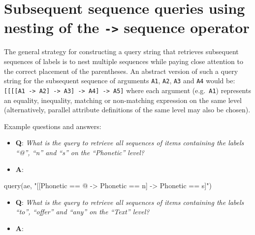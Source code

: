 \documentclass[
]{book}
\newenvironment{Shaded}{\begin{snugshade}}{\end{snugshade}}
\newcommand{\FunctionTok}[1]{\textcolor[rgb]{0.00,0.00,0.00}{#1}}
\newcommand{\NormalTok}[1]{#1}
\newcommand{\StringTok}[1]{\textcolor[rgb]{0.31,0.60,0.02}{#1}}
\providecommand{\tightlist}{%
  \setlength{\itemsep}{0pt}\setlength{\parskip}{0pt}}
\begin{document}
\hypertarget{subsequent-sequence-queries-using-nesting-of-the---sequence-operator}{%
\section{\texorpdfstring{Subsequent sequence queries using nesting of the \texttt{-\textgreater{}} sequence operator}{Subsequent sequence queries using nesting of the -\textgreater{} sequence operator}}\label{subsequent-sequence-queries-using-nesting-of-the---sequence-operator}}

The general strategy for constructing a query string that retrieves subsequent sequences of labels is to nest multiple sequences while paying close attention to the correct placement of the parentheses. An abstract version of such a query string for the subsequent sequence of arguments \texttt{A1}, \texttt{A2}, \texttt{A3} and \texttt{A4} would be: \texttt{{[}{[}{[}{[}A1\ -\textgreater{}\ A2{]}\ -\textgreater{}\ A3{]}\ -\textgreater{}\ A4{]}\ -\textgreater{}\ A5{]}} where each argument (e.g.~\texttt{A1}) represents an equality, inequality, matching or non-matching expression on the same level (alternatively, parallel attribute definitions of the same level may also be chosen).

Example questions and answers:

\begin{itemize}
\tightlist
\item
  \textbf{Q}: \emph{What is the query to retrieve all sequences of items containing the labels ``@'', ``n'' and ``s'' on the ``Phonetic'' level?}
\item
  \textbf{A}:
\end{itemize}

\begin{Shaded}
\begin{Highlighting}[]
\FunctionTok{query}\NormalTok{(ae, }\StringTok{"[[Phonetic == @ {-}\textgreater{} Phonetic == n] {-}\textgreater{} Phonetic == s]"}\NormalTok{)}
\end{Highlighting}
\end{Shaded}

\begin{itemize}
\tightlist
\item
  \textbf{Q}: \emph{What is the query to retrieve all sequences of items containing the labels ``to'', ``offer'' and ``any'' on the ``Text'' level?}
\item
  \textbf{A}:
\end{itemize}
\end{document}
